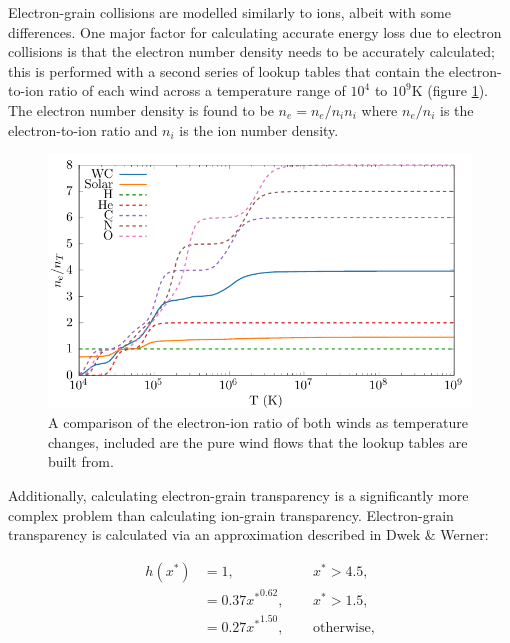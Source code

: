 Electron-grain collisions are modelled similarly to ions, albeit with some differences.
One major factor for calculating accurate energy loss due to electron collisions is that the electron number density needs to be accurately calculated; this is performed with a second series of lookup tables that contain the electron-to-ion ratio of each wind across a temperature range of $10^4$ to $10^9\si{\kelvin}$ (figure \ref{fig:electron-curve}).
The electron number density is found to be $n_e = n_e/n_i n_i$ where $n_e/n_i$ is the electron-to-ion ratio and $n_i$ is the ion number density.

\begin{figure}[h]
  \centering
  \includegraphics{assets/ionisation-fraction/ionisation-fraction.pdf}
  \caption[OB and WR electron-ion ratios]{A comparison of the electron-ion ratio of both winds as temperature changes, included are the pure wind flows that the lookup tables are built from.}
  \label{fig:electron-curve}
\end{figure}

Additionally, calculating electron-grain transparency is a significantly more complex problem than calculating ion-grain transparency.
Electron-grain transparency is calculated via an approximation described in Dwek \& Werner:

\begin{equation}
  \begin{alignedat}{3}
    h(x^*) & = 1 ,                && ~~ x^* > 4.5, \\
           & = 0.37{x^*}^{0.62} , && ~~ x^* > 1.5 , \\
           & = 0.27{x^*}^{1.50} , && ~~ \text{otherwise,}
  \end{alignedat}
\end{equation}


